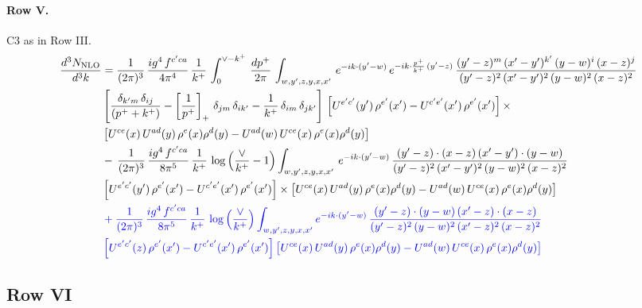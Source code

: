 \documentclass[10pt]{article}
\numberwithin{equation}{section}
\newcommand{\nc}{\color{blue}}
\begin{document}
\paragraph{Row V.}
C3 as in Row III.
\begin{align}
    \frac{d^{3}N_{\rm NLO}}{d^{3}k} & =  \frac{1}{(2\pi)^{3}}\, \frac{ig^{4}\,f^{c'ca}}{4\pi^{4}}\, \frac{1}{k^{+}}\,\int_{0}^{\vee-k^{+}}\, \frac{dp^{+}}{2\pi}\, \int_{w,y',z,y,x,x'}\, e^{-ik\cdot (y'-w)}\, e^{-ik\cdot \frac{p^{+}}{k^{+}}\,(y'-z)}\,\frac{(y'-z)^{m}\,(x'-y')^{k'}\,(y-w)^{i}\,(x-z)^{j}}{(y'-z)^{2}\,(x'-y')^{2}\,(y-w)^{2}\,(x-z)^{2}}\notag \\ & \left[\frac{\delta_{k'm}\,\delta_{ij}}{(p^{+}+k^{+})}-\left[\frac{1}{p^{+}}\right]_{+}\,\delta_{jm}\,\delta_{ik'}-\frac{1}{k^{+}}\, \delta_{im}\, \delta_{jk'}\right]\, \left[U^{e'c'}(y')\,\rho^{e'}(x')-U^{c'e'}(x')\,\rho^{e'}(x')\right]\times \notag \\ &  \left[U^{ce}(x)\,U^{ad}(y)\,\rho^{e}(x)\rho^{d}(y)-U^{ad}(w)\,U^{ce}(x)\,\rho^{e}(x)\rho^{d}(y)\right] \notag \\
& -\,\frac{1}{(2\pi)^{3}}\, \frac{ig^{4}\,f^{c'ca}}{8\pi^{5}}\, \frac{1}{k^{+}}\,\log{\left(\frac{\vee}{k^{+}}-1\right)} \int_{w,y',z,y,x,x'}\, e^{-ik\cdot (y'-w)}\,\frac{(y'-z)\cdot (x-z)\,(x'-y')\cdot (y-w)}{(y'-z)^{2}\,(x'-y')^{2}\,(y-w)^{2}\,(x-z)^{2}}\notag \\ & \left[U^{e'c'}(y')\,\rho^{e'}(x')-U^{c'e'}(x')\,\rho^{e'}(x')\right]\times  \left[U^{ce}(x)\,U^{ad}(y)\,\rho^{e}(x)\rho^{d}(y)-U^{ad}(w)\,U^{ce}(x)\,\rho^{e}(x)\rho^{d}(y)\right] \notag \\
& \nc  +\frac{1}{(2\pi)^{3}}\, \frac{ig^{4}\,f^{c'ca}}{8\pi^{5}}\, \frac{1}{k^{+}}\,\log{\left(\frac{\vee}{k^{+}}\right)}\int_{w,y',z,y,x,x'} e^{-ik\cdot (y'-w)}\,\frac{(y'-z)\cdot (y-w)\,(x'-z)\cdot (x-z)}{(y'-z)^{2}\,(y-w)^{2}\,(x'-z)^{2}\,(x-z)^{2}}\notag \\
& \nc  \left[U^{e'c'}(z)\,\rho^{e'}(x')-U^{c'e'}(x')\,\rho^{e'}(x')\right]\left[U^{ce}(x)\,U^{ad}(y)\,\rho^{e}(x)\rho^{d}(y)-U^{ad}(w)\,U^{ce}(x)\,\rho^{e}(x)\rho^{d}(y)\right] \label{eq:F:G3V}
\end{align}

\subsection{Row VI}
\end{document}
